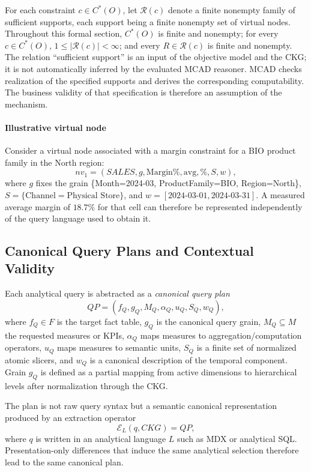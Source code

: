 \documentclass[journal]{IEEEtran}
\begin{document}
For each constraint $c\in C^*(O)$, let $\mathcal R(c)$ denote a finite nonempty family of sufficient supports, each support being a finite nonempty set of virtual nodes. Throughout this formal section, $C^*(O)$ is finite and nonempty; for every $c\in C^*(O)$, $1\le |\mathcal R(c)|<\infty$; and every $R\in\mathcal R(c)$ is finite and nonempty. The relation ``sufficient support'' is an input of the objective model and the CKG; it is not automatically inferred by the evaluated MCAD reasoner. MCAD checks realization of the specified supports and derives the corresponding computability. The business validity of that specification is therefore an assumption of the mechanism.

\paragraph*{Illustrative virtual node}
Consider a virtual node associated with a margin constraint for a BIO product family in the North region:
\[
nv_1=(\textit{SALES},g,\mathrm{Margin\%},\mathrm{avg},\%,S,w),
\]
where $g$ fixes the grain \{Month=2024-03, ProductFamily=BIO, Region=North\}, $S=\{\text{Channel}=\text{Physical Store}\}$, and $w=[2024\text{-}03\text{-}01,2024\text{-}03\text{-}31]$. A measured average margin of $18.7\%$ for that cell can therefore be represented independently of the query language used to obtain it.

\subsection{Canonical Query Plans and Contextual Validity}

Each analytical query is abstracted as a \emph{canonical query plan}
\[
QP=(f_Q,g_Q,M_Q,\alpha_Q,u_Q,S_Q,w_Q),
\]
where $f_Q\in F$ is the target fact table, $g_Q$ is the canonical query grain, $M_Q\subseteq M$ the requested measures or KPIs, $\alpha_Q$ maps measures to aggregation/computation operators, $u_Q$ maps measures to semantic units, $S_Q$ is a finite set of normalized atomic slicers, and $w_Q$ is a canonical description of the temporal component. Grain $g_Q$ is defined as a partial mapping from active dimensions to hierarchical levels after normalization through the CKG.

The plan is not raw query syntax but a semantic canonical representation produced by an extraction operator
\[
\mathcal E_L(q,CKG)=QP,
\]
where $q$ is written in an analytical language $L$ such as MDX or analytical SQL. Presentation-only differences that induce the same analytical selection therefore lead to the same canonical plan.
\end{document}
